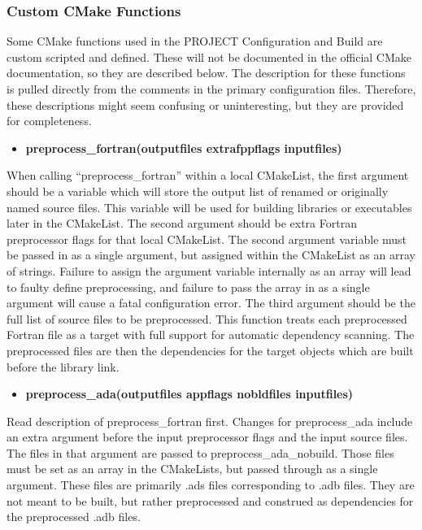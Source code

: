 \documentclass[12pt,letterpaper]{article}
\begin{document}
\subsubsection{Custom CMake Functions}

Some CMake functions used in the PROJECT Configuration and Build are custom scripted and defined.  These will not be documented in the official CMake documentation, so they are described below.  The description for these functions is pulled directly from the comments in the primary configuration files.  Therefore, these descriptions might seem confusing or uninteresting, but they are provided for completeness.

\begin{itemize}
\item \textbf{preprocess\_fortran(outputfiles extrafppflags inputfiles)}
\end{itemize}

When calling ``preprocess\_fortran'' within a local CMakeList, the first argument should be a variable which will store the output list of renamed or originally named source files.  This variable will be used for building libraries or executables later in the CMakeList.  The second argument should be extra Fortran preprocessor flags for that local CMakeList.  The second argument variable must be passed in as a single argument, but assigned within the CMakeList as an array of strings.  Failure to assign the argument variable internally as an array will lead to faulty define preprocessing, and failure to pass the array in as a single argument will cause a fatal configuration error. The third argument should be the full list of source files to be preprocessed.  This function treats each preprocessed Fortran file as a target with full support for automatic dependency scanning.  The preprocessed files are then the dependencies for the target objects which are built before the library link.

\begin{itemize}
\item \textbf{preprocess\_ada(outputfiles appflags nobldfiles inputfiles)}
\end{itemize}

Read description of preprocess\_fortran first.  Changes for preprocess\_ada include an extra argument before the input preprocessor flags and the input source files.  The files in that argument are passed to preprocess\_ada\_nobuild.  Those files must be set as an array in the CMakeLists, but passed through as a single argument.  These files are primarily .ads files corresponding to .adb files.  They are not meant to be built, but rather preprocessed and construed as dependencies for the preprocessed .adb files.
\end{document}
